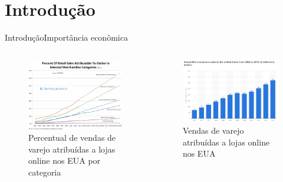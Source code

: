 \section[Introdução]{Introdução}


\begin{frame}{Introdução}{Importância econômica}
\begin{columns}[c] %


\begin{figure}[ht]
    \begin{center}
    \includegraphics[width=1\textwidth]{img/crescimento-ecommerce}\caption{Percentual de vendas de varejo atribuídas a lojas online nos EUA por categoria \cite{crescimento-ecommerce}}
    \end{center}
\end{figure}

\begin{figure}[ht]
    \begin{center}
    \includegraphics[width=1\textwidth]{img/sales-ecommerce}\caption{Vendas de varejo atribuídas a lojas online nos EUA \cite{sales-ecommerce}}
    \end{center}
\end{figure}


\end{columns}
\end{frame}

